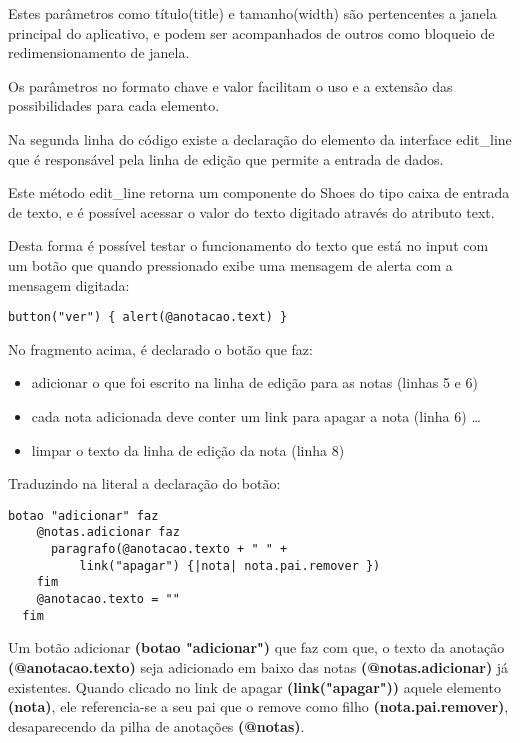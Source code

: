 \documentclass[12pt]{article}
\begin{document}
Estes parâmetros como título(title) e tamanho(width) são pertencentes a janela principal do aplicativo, e podem ser acompanhados de outros como bloqueio de redimensionamento de janela.

Os parâmetros no formato chave e valor facilitam o uso e a extensão das possibilidades para cada elemento.

Na segunda linha do código existe a declaração do elemento da interface edit\_line que é responsável pela linha de edição que permite a entrada de dados. 
 

Este método edit\_line retorna um componente do Shoes do tipo caixa de entrada de texto, e é possível acessar o valor do texto digitado através do atributo text. 

Desta forma é possível testar o funcionamento do texto que está no input com um botão que quando pressionado exibe uma mensagem de alerta com a mensagem digitada:

\begin{lstlisting}[caption=Entendendo a linha de edição]
button("ver") { alert(@anotacao.text) } 
\end{lstlisting}


 

No fragmento acima, é declarado o botão que faz: 

\begin{itemize} 
  \item adicionar o que foi escrito na linha de edição para as notas (linhas 5 e 6)
  \item cada nota adicionada deve conter um link para apagar a nota (linha 6) \ldots
  \item limpar o texto da linha de edição da nota (linha 8)
\end{itemize} 

Traduzindo na literal a declaração do botão:

\begin{lstlisting}[caption=Botão adicionar - código traduzido]
  botao "adicionar" faz
    @notas.adicionar faz 
      paragrafo(@anotacao.texto + " " + 
          link("apagar") {|nota| nota.pai.remover })
    fim  
    @anotacao.texto = ""
  fim
\end{lstlisting}

Um botão adicionar \textbf{(botao "adicionar")} que faz com que, o texto da anotação \textbf{(@anotacao.texto)} seja adicionado em baixo das notas \textbf{(@notas.adicionar)} já existentes. Quando clicado no link de apagar \textbf{(link("apagar"))} aquele elemento \textbf{(nota)}, ele referencia-se a seu pai que o remove como filho \textbf{(nota.pai.remover)}, desaparecendo da pilha de anotações \textbf{(@notas)}.
\end{document}
